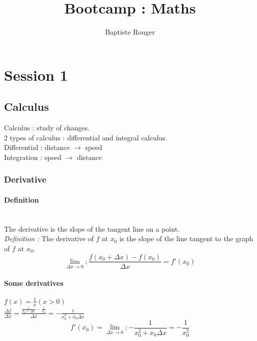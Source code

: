 \documentclass{article}
\title{Bootcamp : Maths}
\author{Baptiste Rouger}
\begin{document}
    \maketitle

    \tableofcontents

    \newpage

    \section{Session 1}


        \subsection{Calculus}

            Calculus : study of changes.\\

            2 types of calculus : differential and integral calculus.\\

            Differential : distance $\rightarrow$ speed\\
            Integration : speed $\rightarrow$ distance\\

                \subsubsection{Derivative}

                    \paragraph{Definition}

                        ~\\The derivative is the slope of the tangent line on a point.\\
                        \textit{Definition :} The derivative of $f$ at $x_0$ is the slope of the line tangent to the graph of $f$ at $x_0$.\\
                        \[ \lim_{\Delta x \to 0}; \frac{f(x_0 + \Delta x) - f(x_0)}{\Delta x} = f'(x_0) \]



                    \paragraph{Some derivatives}
                    $f(x) = \frac{1}{x} (x>0)  $\\
                    $\frac{\Delta f}{\Delta x} =  \frac{\frac{1}{x_0 + \Delta x} - \frac{1}{x_0}}{\Delta x} = -\frac{1}{x_0^2 + x_0 \Delta x} $
                    \[ f'(x_0) = \lim_{\Delta x \to 0}; -\frac{1}{x_0^2 + x_0 \Delta x} = -\frac{1}{x_0^2} \]
                    ~\\~\\
\end{document}
